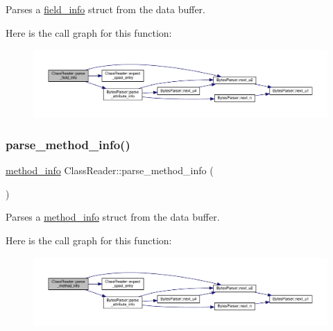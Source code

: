 Parses a \hyperlink{structfield__info}{field\+\_\+info} struct from the data buffer. 

Here is the call graph for this function\+:\nopagebreak
\begin{figure}[H]
\begin{center}
\leavevmode
\includegraphics[width=350pt]{classClassReader_a434b73f04e1502c936593ab63094d838_cgraph}
\end{center}
\end{figure}
\mbox{\label{classClassReader_a0eb68204b1979e2a2758c05f200a7be3}} 
\subsubsection{\texorpdfstring{parse\+\_\+method\+\_\+info()}{parse\_method\_info()}}
{\footnotesize\ttfamily \hyperlink{structmethod__info}{method\+\_\+info} Class\+Reader\+::parse\+\_\+method\+\_\+info (\begin{DoxyParamCaption}{ }\end{DoxyParamCaption})\hspace{0.3cm}{\ttfamily [private]}}



Parses a \hyperlink{structmethod__info}{method\+\_\+info} struct from the data buffer. 

Here is the call graph for this function\+:\nopagebreak
\begin{figure}[H]
\begin{center}
\leavevmode
\includegraphics[width=350pt]{classClassReader_a0eb68204b1979e2a2758c05f200a7be3_cgraph}
\end{center}
\end{figure}



